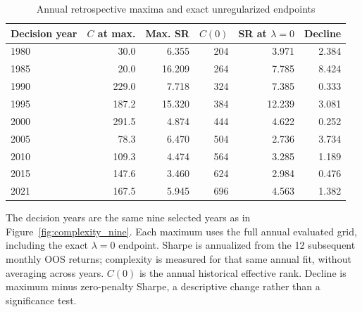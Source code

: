\begin{table}[!htbp]\centering\small\setlength{\tabcolsep}{5pt}
\caption{Annual retrospective maxima and exact unregularized endpoints}
\label{tab:historical_endpoints}
\begin{tabular}{@{}lrrrrr@{}}\toprule
Decision year & $C$ at max. & Max. SR & $C(0)$ & SR at $\lambda=0$ & Decline \\ \midrule
1980 & 30.0 & 6.355 & 204 & 3.971 & 2.384 \\
1985 & 20.0 & 16.209 & 264 & 7.785 & 8.424 \\
1990 & 229.0 & 7.718 & 324 & 7.385 & 0.333 \\
1995 & 187.2 & 15.320 & 384 & 12.239 & 3.081 \\
2000 & 291.5 & 4.874 & 444 & 4.622 & 0.252 \\
2005 & 78.3 & 6.470 & 504 & 2.736 & 3.734 \\
2010 & 109.3 & 4.474 & 564 & 3.285 & 1.189 \\
2015 & 147.6 & 3.460 & 624 & 2.984 & 0.476 \\
2021 & 167.5 & 5.945 & 696 & 4.563 & 1.382 \\
\bottomrule\end{tabular}\par\vspace{5pt}
\begin{minipage}{\textwidth}\footnotesize
The decision years are the same nine selected years as in Figure~\ref{fig:complexity_nine}.
Each maximum uses the full annual evaluated grid, including the exact $\lambda=0$ endpoint.
Sharpe is annualized from the 12 subsequent monthly OOS returns; complexity is measured
for that same annual fit, without averaging across years. $C(0)$ is the annual
historical effective rank. Decline is maximum minus zero-penalty Sharpe,
a descriptive change rather than a significance test.
\end{minipage}\end{table}
